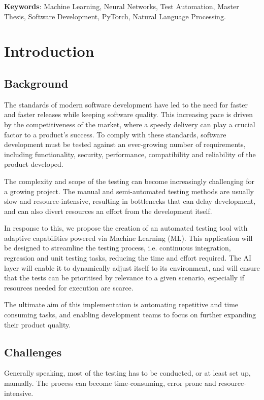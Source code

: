 \documentclass[a4paper, 11pt]{report}
\begin{document}
\textbf{Keywords}: Machine Learning, Neural Networks, Test Automation, Master Thesis, Software Development, PyTorch, Natural Language Processing.
\tableofcontents
\listoffigures
\listoftables


\chapter{Introduction} \label{Section: Introduction}
\setcounter{page}{1}
\pagestyle{plain}
\section{Background}
The standards of modern software development have led to the need for faster and faster releases while keeping software quality. This increasing pace is driven by the competitiveness of the market, where a speedy delivery can play a crucial factor to a product's success. To comply with these standards, software development must be tested against an ever-growing number of requirements, including functionality, security, performance, compatibility and reliability of the product developed.

The complexity and scope of the testing can become increasingly challenging for a growing project. The manual and semi-automated testing methods are usually slow and resource-intensive\cite{Mandic2023Test}, resulting in bottlenecks that can delay development, and can also divert resources an effort from the development itself.\cite{LAUWAERTS2024Test}

In response to this, we propose the creation of an automated testing tool with adaptive capabilities powered via Machine Learning (ML). This application will be designed to streamline the testing process, i.e. continuous integration, regression and unit testing tasks, reducing the time and effort required. The AI layer will enable it to dynamically adjust itself to its environment, and will ensure that the tests can be prioritised by relevance to a given scenario, especially if resources needed for execution are scarce.

The ultimate aim of this implementation is automating repetitive and time consuming tasks, and enabling development teams to focus on further expanding their product quality.

\section{Challenges}
Generally speaking, most of the testing has to be conducted, or at least set up, manually. The process can become time-consuming, error prone and resource-intensive.
\end{document}
